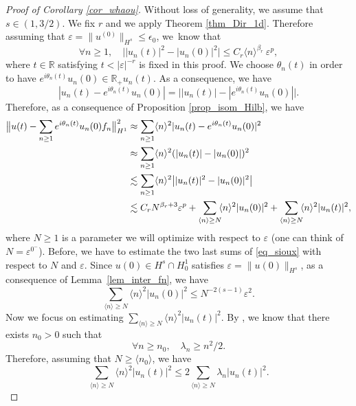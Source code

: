 \begin{proof}[Proof of Corollary \ref{cor_whaou}] Without loss of generality, we assume that $s\in (1,3/2)$. We fix $r$ and we apply Theorem \ref{thm_Dir_1d}. Therefore assuming that $\varepsilon=\| u^{(0)}\|_{H^s}\leq \epsilon_0$, we~know that
\[
\forall n\geq 1, \quad \big| |u_n(t)|^2 - |u_n(0)|^2 \big| \leq C_r \langle n \rangle^{\beta_r} \ \varepsilon^p,
\]
where $t\in \mathbb{R}$ satisfying $t<|\varepsilon|^{-r}$ is fixed in this proof. We choose $\theta_n(t)$ in order to have $e^{i\theta_n(t)}u_n(0) \in \mathbb{R}_+ u_n(t) $. As a consequence, we have
\[
|u_n(t) - e^{i\theta_n(t)} u_n(0)| = \bigl||u_n(t)| -| e^{i\theta_n(t)} u_n(0)| \bigr|.
\]
Therefore, as a consequence of Proposition \ref{prop_isom_Hilb}, we have
\begin{equation*}
\label{eq_sioux}
\begin{split}
\big\| u(t) - \sum_{n\geq 1} e^{i\theta_n(t)} u_n(0) f_n \big\|_{H^1}^2 &\approx \sum_{n\geq 1} \langle n \rangle^2 |u_n(t) - e^{i\theta_n(t)} u_n(0)|^2\\
&\approx \sum_{n\geq 1} \langle n \rangle^2 (|u_n(t)| - |u_n(0)|)^2 \\
&\lesssim \sum_{n\geq 1} \langle n \rangle^2 \bigl||u_n(t)|^2 - |u_n(0)|^2\bigr| \\ & \lesssim C_r N^{\beta_r+3} \varepsilon^p + \sum_{\langle n \rangle \geq N}\hspace*{-1mm} \langle n \rangle^2 |u_n(0)|^2 + \sum_{\langle n \rangle \geq N}\hspace*{-1mm} \langle n \rangle^2 |u_n(t)|^2,
\end{split}
\end{equation*}
where $N\geq 1$ is a parameter we will optimize with respect to $\varepsilon$ (one can think of $N=\varepsilon^{0^-}$). Before, we have to estimate the two last sums of \eqref{eq_sioux} with respect to $N$ and $\varepsilon$. Since $u(0) \in H^s\cap H^{1}_0$ satisfies $\varepsilon= \|u(0)\|_{H^s}$, as a consequence of Lemma~\ref{lem_inter_fn}, we have
\begin{equation}
\label{est_rem1}
\sum_{\langle n \rangle \geq N} \langle n \rangle^2 |u_n(0)|^2 \leq N^{-2(s-1)} \varepsilon^2.
\end{equation}
Now we focus on estimating $\sum_{\langle n \rangle \geq N} \langle n \rangle^2 |u_n(t)|^2$. By \cite[Th.\,4 p.\,35]{PT}, we know that there exists $n_0>0$ such that
\[
\forall n\geq n_0, \quad \lambda_n \geq n^2/2.
\]
Therefore, assuming that $N\geq \langle n_0\rangle $, we have
\[
\sum_{\langle n \rangle \geq N} \langle n \rangle^2 |u_n(t)|^2 \leq 2 \sum_{\langle n \rangle \geq N} \lambda_n |u_n(t)|^2.
\]
\end{proof}
